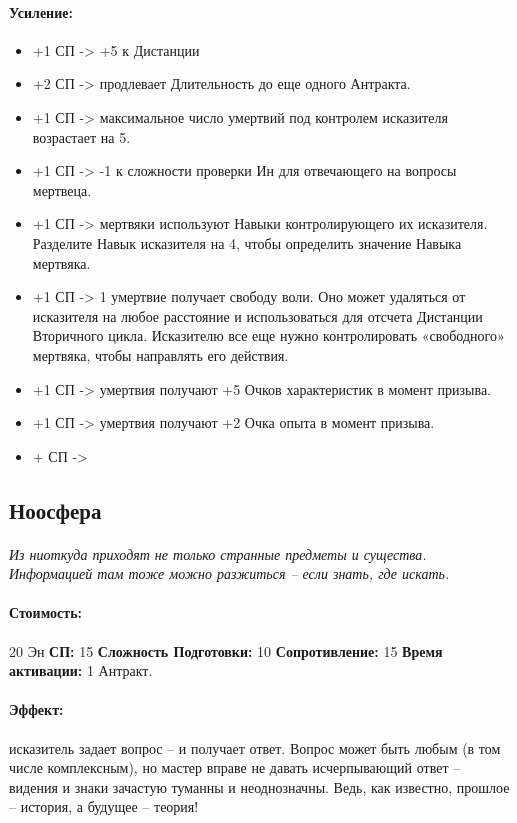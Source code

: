 \paragraph{Усиление:}
\begin{itemize}
\item+1 СП -> +5 к Дистанции
\item+2 СП -> продлевает Длительность до еще одного Антракта.
\item+1 СП -> максимальное число умертвий под контролем исказителя возрастает на 5.
\item+1 СП -> -1 к сложности проверки Ин для отвечающего на вопросы мертвеца.
\item+1 СП -> мертвяки используют Навыки контролирующего их исказителя. Разделите Навык исказителя на 4, чтобы определить значение Навыка мертвяка.
\item+1 СП -> 1 умертвие получает свободу воли. Оно может удаляться от исказителя на любое расстояние и использоваться для отсчета Дистанции Вторичного цикла. Исказителю все еще нужно контролировать «свободного» мертвяка, чтобы направлять его действия.
\item+1 СП -> умертвия получают +5 Очков характеристик в момент призыва.
\item+1 СП -> умертвия получают +2 Очка опыта в момент призыва.
\item+ СП -> 
\end{itemize}
\subsection{Ноосфера}
\paragraph{} 
\textit{Из ниоткуда приходят не только странные предметы и существа. Информацией там тоже можно разжиться – если знать, где искать.}
\paragraph{Стоимость: }20 Эн
\leavevmode
\newline 
\textbf{СП: }15
\leavevmode
\newline 
\textbf{Сложность Подготовки: }10
\leavevmode
\newline 
\textbf{Сопротивление: }15
\leavevmode
\newline 
\textbf{Время активации: }1 Антракт.
\paragraph{Эффект: }исказитель задает вопрос – и получает ответ. Вопрос может быть любым (в том числе комплексным), но мастер вправе не давать исчерпывающий ответ – видения и знаки зачастую туманны и неоднозначны. Ведь, как известно, прошлое – история, а будущее – теория!
